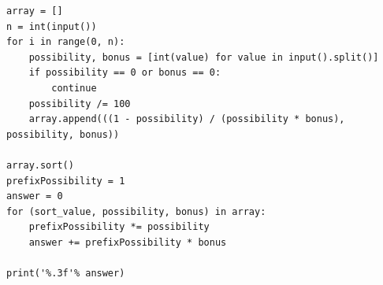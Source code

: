 




%
\begin{latin}
\begin{lstlisting}
array = []
n = int(input())
for i in range(0, n):
    possibility, bonus = [int(value) for value in input().split()]
    if possibility == 0 or bonus == 0:
        continue
    possibility /= 100
    array.append(((1 - possibility) / (possibility * bonus), possibility, bonus))

array.sort()
prefixPossibility = 1
answer = 0
for (sort_value, possibility, bonus) in array:
    prefixPossibility *= possibility
    answer += prefixPossibility * bonus

print('%.3f'% answer)

\end{lstlisting}
\end{latin}